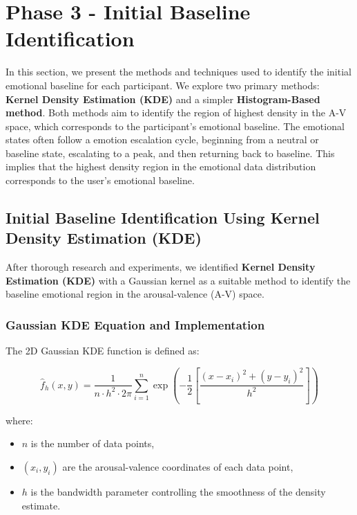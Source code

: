 \section{Phase 3 - Initial Baseline Identification}
\label{sec:initial-baseline}

\par In this section, we present the methods and techniques used to identify the initial emotional baseline for each participant. We explore two primary methods: \textbf{Kernel Density Estimation (KDE)} and a simpler \textbf{Histogram-Based method}. Both methods aim to identify the region of highest density in the A-V space, which corresponds to the participant's emotional baseline. The emotional states often follow a emotion escalation cycle, beginning from a neutral or baseline state, escalating to a peak, and then returning back to baseline. This implies that the highest density region in the emotional data distribution corresponds to the user's emotional baseline.

\subsection{Initial Baseline Identification Using Kernel Density Estimation (KDE)}

\par After thorough research and experiments, we identified \textbf{Kernel Density Estimation (KDE)} with a Gaussian kernel as a suitable method to identify the baseline emotional region in the arousal-valence (A-V) space. 

\subsubsection*{Gaussian KDE Equation and Implementation}

\par The 2D Gaussian KDE function is defined as:

\begin{equation}
\hat{f}_h(x, y) = \frac{1}{n \cdot h^2 \cdot 2\pi} \sum_{i=1}^{n} \exp\left(-\frac{1}{2} \left[ \frac{(x - x_i)^2 + (y - y_i)^2}{h^2} \right] \right)
\end{equation}

\noindent where:
\begin{itemize}
    \item $n$ is the number of data points,
    \item $(x_i, y_i)$ are the arousal-valence coordinates of each data point,
    \item $h$ is the bandwidth parameter controlling the smoothness of the density estimate.
\end{itemize}

